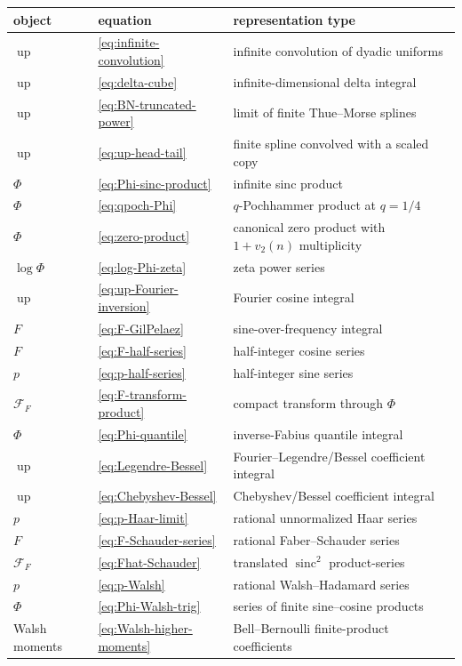 \documentclass[11pt,oneside]{article}
\theoremstyle{definition}
\theoremstyle{remark}
\newcommand{\Up}{\operatorname{up}}
\newcommand{\sinc}{\operatorname{sinc}}
\begin{document}
\begin{longtable}{@{}p{}p{}p{}@{}}
\toprule
object & equation & representation type\\
\midrule
\endhead
$\Up$ & \eqref{eq:infinite-convolution} & infinite convolution of dyadic uniforms\\
$\Up$ & \eqref{eq:delta-cube} & infinite-dimensional delta integral\\
$\Up$ & \eqref{eq:BN-truncated-power} & limit of finite Thue--Morse splines\\
$\Up$ & \eqref{eq:up-head-tail} & finite spline convolved with a scaled copy\\
$\Phi$ & \eqref{eq:Phi-sinc-product} & infinite sinc product\\
$\Phi$ & \eqref{eq:qpoch-Phi} & $q$-Pochhammer product at $q=1/4$\\
$\Phi$ & \eqref{eq:zero-product} & canonical zero product with $1+v_2(n)$ multiplicity\\
$\log\Phi$ & \eqref{eq:log-Phi-zeta} & zeta power series\\
$\Up$ & \eqref{eq:up-Fourier-inversion} & Fourier cosine integral\\
$F$ & \eqref{eq:F-GilPelaez} & sine-over-frequency integral\\
$F$ & \eqref{eq:F-half-series} & half-integer cosine series\\
$p$ & \eqref{eq:p-half-series} & half-integer sine series\\
$\mathscr F_F$ & \eqref{eq:F-transform-product} & compact transform through $\Phi$\\
$\Phi$ & \eqref{eq:Phi-quantile} & inverse-Fabius quantile integral\\
$\Up$ & \eqref{eq:Legendre-Bessel} & Fourier--Legendre/Bessel coefficient integral\\
$\Up$ & \eqref{eq:Chebyshev-Bessel} & Chebyshev/Bessel coefficient integral\\
$p$ & \eqref{eq:p-Haar-limit} & rational unnormalized Haar series\\
$F$ & \eqref{eq:F-Schauder-series} & rational Faber--Schauder series\\
$\mathscr F_F$ & \eqref{eq:Fhat-Schauder} & translated $\sinc^2$ product-series\\
$p$ & \eqref{eq:p-Walsh} & rational Walsh--Hadamard series\\
$\Phi$ & \eqref{eq:Phi-Walsh-trig} & series of finite sine--cosine products\\
Walsh moments & \eqref{eq:Walsh-higher-moments} & Bell--Bernoulli finite-product coefficients\\

\end{longtable}
\end{document}
